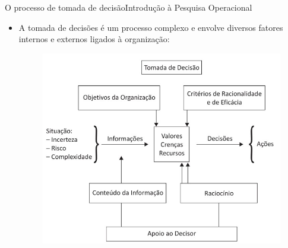 \documentclass[t]{beamer}
\begin{document}
\begin{ftst}{O processo de tomada de decisão}{Introdução à Pesquisa Operacional}
\begin{itemize}
    \item A tomada de decisões é um processo complexo e envolve diversos fatores internos e externos ligados à organização:
    \begin{figure}
        \centering
        \includegraphics[scale=0.4]{Figuras/tomada_decisao.jpg}
    \end{figure}
\end{itemize}

\end{ftst}

\end{document}

